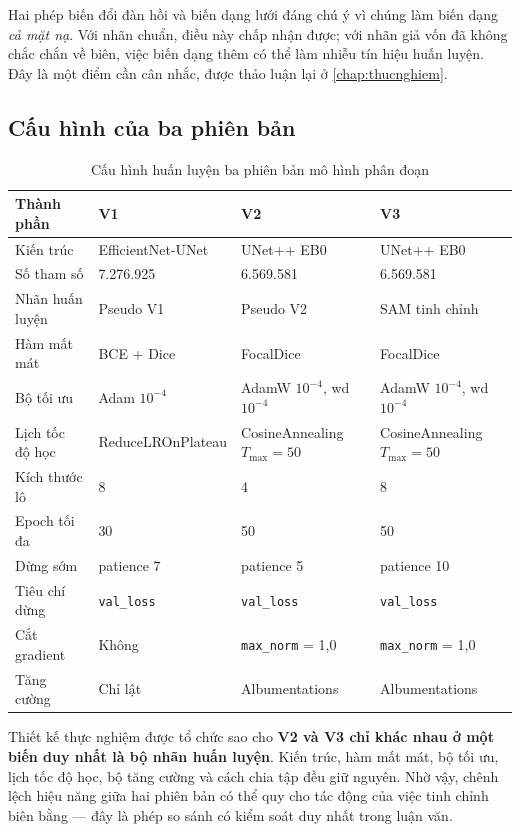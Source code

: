 Hai phép biến đổi đàn hồi và biến dạng lưới đáng chú ý vì chúng làm biến dạng
\emph{cả mặt nạ}. Với nhãn chuẩn, điều này chấp nhận được; với nhãn giả vốn đã
không chắc chắn về biên, việc biến dạng thêm có thể làm nhiễu tín hiệu huấn luyện.
Đây là một điểm cần cân nhắc, được thảo luận lại ở \cref{chap:thucnghiem}.

\subsection{Cấu hình của ba phiên bản}

\begin{table}[H]
\centering
\caption{Cấu hình huấn luyện ba phiên bản mô hình phân đoạn}
\label{tab:cauhinh_seg}
\small
\begin{tabular}{L{3.2cm} L{3.2cm} L{3.2cm} L{3.2cm}}
\toprule
\textbf{Thành phần} & \textbf{V1} & \textbf{V2} & \textbf{V3} \\
\midrule
Kiến trúc & EfficientNet-UNet & UNet++ EB0 & UNet++ EB0 \\
Số tham số & 7.276.925 & 6.569.581 & 6.569.581 \\
Nhãn huấn luyện & Pseudo V1 & Pseudo V2 & SAM tinh chỉnh \\
Hàm mất mát & BCE + Dice & FocalDice & FocalDice \\
Bộ tối ưu & Adam $10^{-4}$ & AdamW $10^{-4}$, wd $10^{-4}$ & AdamW $10^{-4}$, wd $10^{-4}$ \\
Lịch tốc độ học & ReduceLROnPlateau & CosineAnnealing $T_{\max}=50$ & CosineAnnealing $T_{\max}=50$ \\
Kích thước lô & 8 & 4 & 8 \\
Epoch tối đa & 30 & 50 & 50 \\
Dừng sớm & patience 7 & patience 5 & patience 10 \\
Tiêu chí dừng & \texttt{val\_loss} & \texttt{val\_loss} & \texttt{val\_loss} \\
Cắt gradient & Không & \texttt{max\_norm} = 1,0 & \texttt{max\_norm} = 1,0 \\
Tăng cường & Chỉ lật & Albumentations & Albumentations \\
\bottomrule
\end{tabular}
\end{table}

Thiết kế thực nghiệm được tổ chức sao cho \textbf{V2 và V3 chỉ khác nhau ở một
biến duy nhất là bộ nhãn huấn luyện}. Kiến trúc, hàm mất mát, bộ tối ưu, lịch tốc
độ học, bộ tăng cường và cách chia tập đều giữ nguyên. Nhờ vậy, chênh lệch hiệu
năng giữa hai phiên bản có thể quy cho tác động của việc tinh chỉnh biên bằng
\SAM{} --- đây là phép so sánh có kiểm soát duy nhất trong luận văn.

